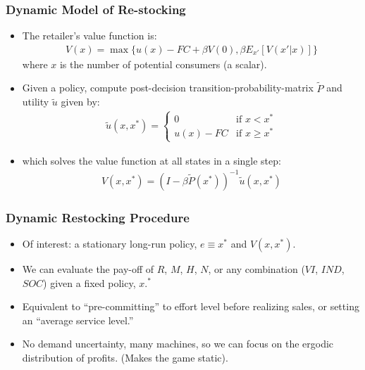 \begin{frame}
\frametitle{Dynamic Model of Re-stocking}
\begin{itemize}
\item The retailer's value function is:
\begin{eqnarray}
\label{bellman}
V(x) = \max \{u(x) - FC + \beta V(0), \beta E_{x'}[V(x' | x)]\}
\end{eqnarray}
where $x$ is the number of potential consumers (a scalar).
\item Given a policy, compute post-decision transition-probability-matrix $\tilde{P}$ and utility $\tilde{u}$ given by:
\begin{eqnarray*}
 \tilde{u}(x,x^{*})= \begin{cases} 0 &\mbox{if } x < x^{*} \\ 
u(x) - FC & \mbox{if } x \geq x^{*}
 \end{cases}
\end{eqnarray*}
\item which solves the value function at all states in a single step:
\begin{eqnarray}
\label{pistep}
V(x,x^{*}) = (I - \beta \tilde{P}(x^{*}))^{-1} \tilde{u}(x,x^{*}) 
\end{eqnarray}
\end{itemize}
\end{frame}


\begin{frame}
\frametitle{Dynamic Restocking Procedure}
\small
\begin{itemize}
\item Of interest: a stationary long-run policy, $e \equiv x^{*}$ and $V(x,x^{*}).$
\item We can evaluate the pay-off of $R$, $M$, $H$, $N$, or any combination ($VI$, $IND$, $SOC$) given a fixed policy, $x.^*$
\item Equivalent to ``pre-committing'' to effort level before realizing sales, or setting an ``average service level.'' 
\item No demand uncertainty, many machines, so we can focus on the ergodic distribution of profits. (Makes the game static).
\end{itemize}
\end{frame}




